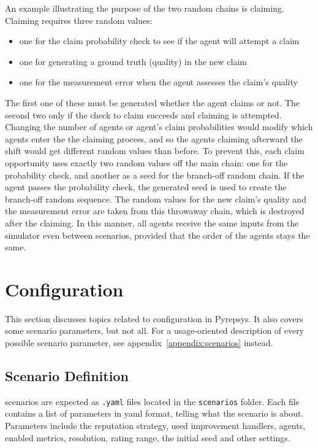 \documentclass[%
    ]{\PathToTumTemplate/thesis/tum_thesis}
\begin{document}
An example illustrating the purpose of the two random chains is claiming.
Claiming requires three random values: 
\begin{itemize}
	\item one for the claim probability check to see if the agent will attempt a claim
	\item one for generating a ground truth (quality) in the new claim
	\item one for the measurement error when the agent assesses the claim's quality
\end{itemize}
The first one of these must be generated whether the agent claims or not.
The second two only if the check to claim succeeds and claiming is attempted.
Changing the number of agents or agent's claim probabilities would modify which agents enter the the claiming process, and so the agents claiming afterward the shift would get different random values than before.
To prevent this, each claim opportunity uses exactly two random values off the main chain: one for the probability check, and another as a seed for the branch-off random chain.
If the agent passes the probability check, the generated seed is used to create the branch-off random sequence.
The random values for the new claim's quality and the measurement error are taken from this throwaway chain, which is destroyed after the claiming.
In this manner, all agents receive the same inputs from the simulator even between scenarios, provided that the order of the agents stays the same.



\section{Configuration}\label{sec:impl_config}

This section discusses topics related to configuration in Pyrepsys.
It also covers some scenario parameters, but not all.
For a usage-oriented description of every possible scenario parameter, see appendix~\ref{appendix:scenarios} instead.


\subsection{Scenario Definition}
\Glspl{scenario} are expected as \texttt{.yaml} files located in the \texttt{scenarios} folder.
Each file contains a list of parameters in yaml format, telling what the scenario is about.
Parameters include the reputation strategy, used improvement handlers, agents, enabled metrics, resolution, rating range, the initial seed and other settings.
\end{document}
